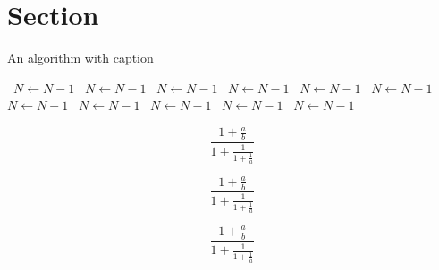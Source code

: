 \documentclass[a4paper]{article}
\begin{document}
\section{Section}

\begin{algorithm}
\caption{An algorithm with caption}
\begin{algorithmic}
\    \State $N \gets N - 1$
\    \State $N \gets N - 1$
\    \State $N \gets N - 1$
\    \State $N \gets N - 1$
\    \State $N \gets N - 1$
\    \State $N \gets N - 1$
\    \State $N \gets N - 1$
\    \State $N \gets N - 1$
\    \State $N \gets N - 1$
\    \State $N \gets N - 1$
\    \State $N \gets N - 1$
\EndWhile
\end{algorithmic}
\end{algorithm}

\[ \frac{1+\frac{a}{b}}{1+\frac{1}{1+\frac{1}{a}}} \]

\[ \frac{1+\frac{a}{b}}{1+\frac{1}{1+\frac{1}{a}}} \]

\[ \frac{1+\frac{a}{b}}{1+\frac{1}{1+\frac{1}{a}}} \]
\end{document}
